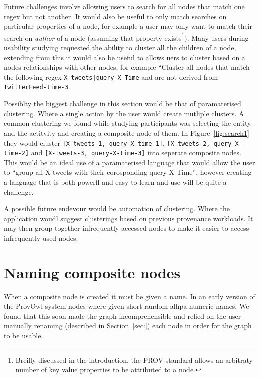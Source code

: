 Future challenges involve allowing users to search for all nodes that match one regex but not another. It would also be useful to only match searches on particular properties of a node, for example a user may only want to match their search on \textit{author} of a node (assuming that property exists\footnote{Breifly discussed in the introduction, the PROV standard allows an arbitraty number of key value properties to be attributed to a node.}). Many users during usability studying requested the ability to cluster all the children of a node, extending from this it would also be useful to allows uers to cluster based on a nodes relationships with other nodes, for example ``Cluster all nodes that match the following regex \texttt{X-tweets|query-X-Time} and are not derived from \texttt{TwitterFeed-time-3}.

Possiblty the biggest challenge in this section would be that of paramaterised clustering. Where a single action by the user would create mutliple clusters. A common clustering we found while studying participants was selecting the entity and the actitvity and creating a composite node of them. In Figure~\ref{fig:search1} they would cluster \texttt{[X-tweets-1, query-X-time-1]}, \texttt{[X-tweets-2, query-X-time-2]} and \texttt{[X-tweets-3, query-X-time-3]} into seperate composite nodes. This would be an ideal use of a paramaterised language that would allow the user to ``group all X-tweets with their corosponding query-X-Time'', however creating a language that is both powerfl and easy to learn and use will be quite a challenge.

A possible future endevour would be automation of clustering. Where the application woudl suggest clusterings based on previous provenance workloads. It may then group together infrequently accessed nodes to make it easier to access infrequently used nodes.

\section{Naming composite nodes}
\label{sec:naming_composite_nodes}

When a composite node is created it must be given a name. In an early version of the ProvOwl system nodes where given short random alhpa-numeric names. We found that this soon made the graph incomprehensible and relied on the user manually 
renaming (described in Section~\ref{sec:}) each node in order for the graph to be usable. 

